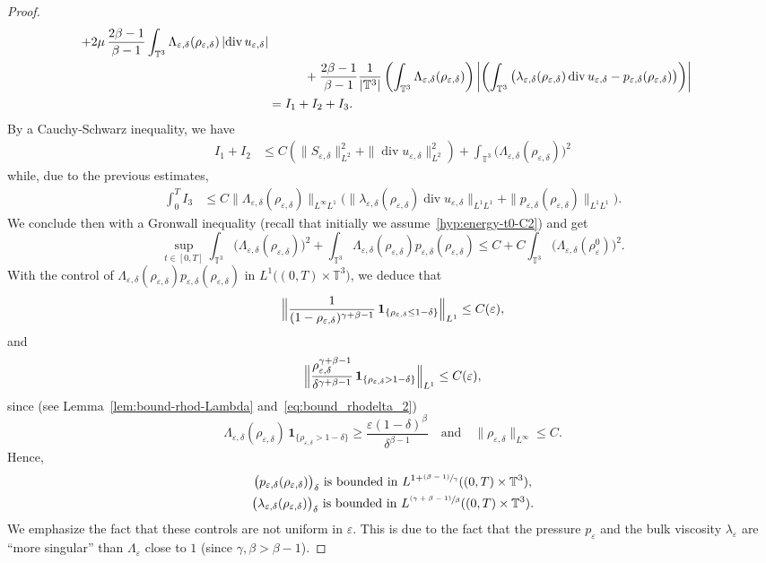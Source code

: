 \documentclass[JEP,XML,SOM,Unicode,NoEqCountersInSection]{cedram}
\newcommand{\<}{\bigl\langle}
\renewcommand{\>}{\bigr\rangle}
\newcommand{\psfrac}[2]{\sfrac{(#1)}{#2}}
\newcommand{\labeleq}[1]{}
\theoremstyle{definition}
\theoremstyle{remark}
\newcommand{\TT}{\mathbb{T}^3}
\DeclareMathOperator{\Div}{div}
\let\ep\varepsilon
\begin{document}
\begin{proof}
\begin{align*}
+ 2\mu\,\dfrac{2\beta -1}{\beta-1} \int_{\TT}{\Lambda_{\ep,\delta}(\rho_{\ep,\delta})\,
| {\Div u_{\ep,\delta}}|} \\
&
\hspace*{1cm}+ \dfrac{2\beta -1}{\beta-1} \dfrac{1}{|\TT|}\left(\int_{\TT}{\Lambda_{\ep,\delta}(\rho_{\ep,\delta})}\right) \biggl|\left(\int_{\TT}{\big(\lambda_{\ep,\delta}(\rho_{\ep,\delta})\Div u_{\ep,\delta} - p_{\ep,\delta} (\rho_{\ep,\delta})\big)} \right) \biggr| \\
& = I_1 + I_2 + I_3.
\end{align*}
By a Cauchy-Schwarz inequality, we have
\begin{align*}
I_1 + I_2
& \leq C (\|S_{\ep,\delta}\|_{L^2}^2 + \|{\Div u_{\ep,\delta}}\|_{L^2}^2) + \int_{\TT}{\big(\Lambda_{\ep,\delta}(\rho_{\ep,\delta})\big)^{2}}
\end{align*}
while, due to the previous estimates,
\begin{align*}
\int_0^T I_3
& \leq C \|\Lambda_{\ep,\delta}(\rho_{\ep,\delta})\|_{L^\infty L^1}
\big(\|\lambda_{\ep,\delta}(\rho_{\ep,\delta})\Div u_{\ep,\delta}\|_{L^1L^1} + \|p_{\ep,\delta} (\rho_{\ep,\delta})\|_{L^1L^1} \big).
\end{align*}
We conclude then with a Gronwall inequality (recall that initially we assume~\eqref{hyp:energy-t0-C2}) and get
\begin{equation*}
\sup_{t \in [0,T]}\int_{\TT}{\big(\Lambda_{\ep,\delta}(\rho_{\ep,\delta})\big)^{2}}
+ \int_{\TT}{\Lambda_{\ep,\delta}(\rho_{\ep,\delta}) p_{\ep,\delta} (\rho_{\ep,\delta})}
\leq C + C\int_{\TT}{\big(\Lambda_{\ep,\delta}(\rho_{\ep}^0)\big)^{2}}.
\end{equation*}
With the control of $\Lambda_{\ep,\delta}(\rho_{\ep,\delta}) p_{\ep,\delta}(\rho_{\ep,\delta})$ in $L^1\big((0,T)\times \TT\big)$, we deduce that
\[
\Bigl\|\dfrac{1}{(1-\rho_{\ep,\delta})^{\gamma + \beta-1} }\,\mathbf{1}_{\{ \rho_{\ep,\delta} \leq 1-\delta \}} \Bigr\|_{L^1} \leq C(\ep),
\]
and
\[
\Bigl\|\dfrac{\rho_{\ep,\delta}^{\gamma + \beta -1}}{\delta^{\gamma+ \beta-1}} \,\mathbf{1}_{\{ \rho_{\ep,\delta} > 1-\delta \}} \Bigr\|_{L^1} \leq C(\ep),
\]
since (see Lemma~\ref{lem:bound-rhod-Lambda} and~\eqref{eq:bound_rhodelta_2})
\[
\Lambda_{\ep,\delta}(\rho_{\ep,\delta})\,\mathbf{1}_{\{ \rho_{\ep,\delta} > 1-\delta \}}
\geq \dfrac{\ep (1-\delta)^\beta}{\delta^{\beta-1}}
\quad \text{and} \quad
\|\rho_{\ep,\delta}\|_{L^\infty} \leq C.
\]
Hence,
\begin{gather}\labeleq{pdelta2}
\big(p_{\ep,\delta}(\rho_{\ep,\delta})\big)_\delta ~ \text{is bounded in} ~ L^{1 + \psfrac{\beta-1}{\gamma}}((0,T)\times \TT),\notag\\
\label{eq:lambdadelta2}
\big(\lambda_{\ep,\delta}(\rho_{\ep,\delta})\big)_\delta ~ \text{is bounded in} ~ L^{\psfrac{\gamma + \beta - 1}{\beta}}((0,T)\times \TT).
\end{gather}
We emphasize the fact that these controls are not uniform in $\ep$.
This is due to the fact that the pressure $p_\ep$ and the bulk viscosity $\lambda_\ep$ are ``more singular'' than $\Lambda_\ep$ close to $1$ (since $\gamma, \beta > \beta-1$).
\end{proof}
\end{document}
